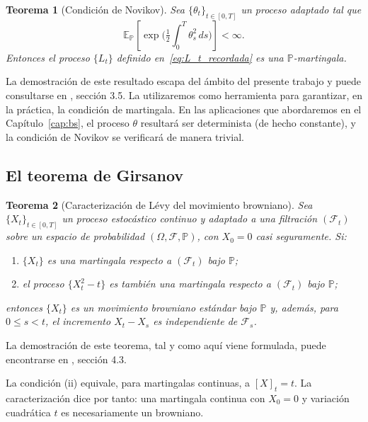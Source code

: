 \documentclass[11pt,a4paper,oneside]{report}
\theoremstyle{plain}
\newtheorem{teorema}{Teorema}[chapter]
\theoremstyle{definition}
\theoremstyle{remark}
\newcommand{\E}{\mathbb{E}}
\newcommand{\PP}{\mathbb{P}}
\newcommand{\F}{\mathcal{F}}
\newcommand{\1}{\mathbf{1}}
\begin{document}
\begin{teorema}[Condición de Novikov]
\label{teo:novikov}
Sea $\{\theta_t\}_{t \in [0, T]}$ un proceso adaptado tal que
\begin{equation}\label{eq:novikov}
  \E_\PP\!\left[\exp\!\biggl(\tfrac{1}{2} \int_0^T \theta_s^2\, ds\biggr)\right]
  < \infty.
\end{equation}
Entonces el proceso $\{L_t\}$ definido en~\eqref{eq:L_t_recordada} es
una $\PP$-martingala.
\end{teorema}

La demostración de este resultado escapa del
ámbito del presente trabajo y puede consultarse en
\cite{karatzas-shreve}, sección 3.5. La utilizaremos como herramienta
para garantizar, en la práctica, la condición de martingala. En las
aplicaciones que abordaremos en el Capítulo~\ref{cap:bs}, el proceso
$\theta$ resultará ser determinista (de hecho constante), y la
condición de Novikov se verificará de manera trivial.

\subsection{El teorema de Girsanov}
\label{subsec:girsanov_teorema}

\begin{teorema}[Caracterización de Lévy del movimiento browniano]
\label{teo:caracterizacion_levy}
Sea $\{X_t\}_{t \in [0, T]}$ un proceso estocástico continuo y
adaptado a una filtración $(\F_t)$ sobre un espacio de probabilidad
$(\Omega, \F, \PP)$, con $X_0 = 0$ casi seguramente.
Si:
\begin{enumerate}[label=\textnormal{(\roman*)}]
  \item $\{X_t\}$ es una martingala respecto a $(\F_t)$ bajo $\PP$;
  \item el proceso $\{X_t^2 - t\}$ es también una martingala respecto a
        $(\F_t)$ bajo $\PP$;
\end{enumerate}
entonces $\{X_t\}$ es un movimiento browniano estándar bajo $\PP$ y, además, para $0 \leq s < t$, el incremento $X_t - X_s$ es independiente de $\F_s$.
\end{teorema}

La demostración de este teorema, tal y como aquí viene formulada, puede encontrarse en \cite{etheridge}, sección 4.3.

La condición (ii) equivale, para martingalas continuas, a $[X]_t =
t$. La caracterización dice por tanto: una martingala continua con
$X_0 = 0$ y variación cuadrática $t$ es necesariamente un browniano.
\end{document}
